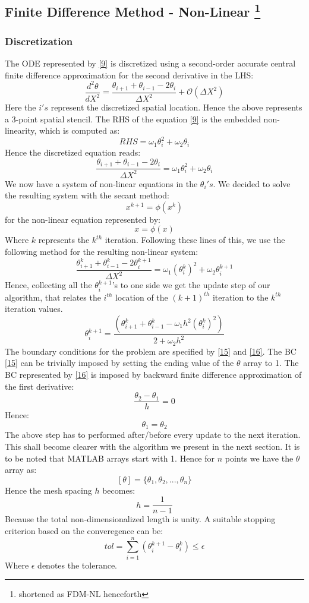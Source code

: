 \documentclass[12pt]{article}
\begin{document}
\subsection{Finite Difference Method - Non-Linear \footnote{shortened as FDM-NL henceforth}}
\subsubsection{Discretization}
The ODE represented by \eqref{9} is discretized using a second-order accurate central finite difference approximation for the second derivative in the LHS: 
\[
\frac{d^2\theta}{dX^2} = \frac{\theta_{i+1}+\theta_{i-1}-2\theta_i}{\Delta X^2} + \mathcal{O}(\Delta X^2) \tag{27} \label{27}
\]
Here the $i's$ represent the discretized spatial location.  Hence the above represents a 3-point spatial stencil. The RHS of the equation \eqref{9} is the embedded non-linearity, which is computed as:
\[
RHS = \omega_1 \theta_i^2 + \omega_2 \theta_i \tag{28} \label{28}
\]
Hence the discretized equation reads:
\[
 \frac{\theta_{i+1}+\theta_{i-1}-2\theta_i}{\Delta X^2} = \omega_1 \theta_i^2 + \omega_2 \theta_i \tag{29} \label{29}
\]
We now have a system of non-linear equations in the $\theta_i's$. We decided to solve the resulting system with the secant method: 
\[
x^{k+1} = \phi (x^k) \tag{30} \label{30}
\]
for the non-linear equation represented by:
\[
x = \phi (x) \tag{31} \label{31}
\]
Where $k$ represents the $k^{th}$ iteration. Following these lines of this, we use the following method for the resulting non-linear system: 
\[
\frac{\theta_{i+1}^k+\theta_{i-1}^k-2\theta_i^{k+1}}{\Delta X^2} = \omega_1 (\theta_i^k)^2 + \omega_2 \theta_i^{k+1} \tag{32} \label{32}
\]
Hence, collecting all the $\theta_i^{k+1}$'s to one side we get the update step of our algorithm, that relates the $i^{th}$ location of the $(k+1)^{th}$ iteration to the $k^{th}$ iteration values. 
\[
\theta_i^{k+1} = \frac{(\theta_{i+1}^k+\theta_{i-1}^k-\omega_1 h^2 (\theta_{i}^k)^2)}{2+\omega_2 h^2} \tag{33} \label{33}
\]
The boundary conditions for the problem are specified by \eqref{15} and \eqref{16}. The BC \eqref{15} can be trivially imposed by setting the ending value of the $\theta$ array to 1. The BC represented by \eqref{16} is imposed by backward finite difference approximation of the first derivative:
\[
\frac{\theta_2-\theta_1}{h} = 0 \label{34} \tag{34}
\]
Hence: 
\[
\theta_1 = \theta_2 \label{35} \tag{35}
\]
The above step has to performed after/before every update to the next iteration. This shall become clearer with the algorithm we present in the next section. It is to be noted that MATLAB arrays start with 1. Hence for $n$ points we have the $\theta$ array as: 
\[
[\theta] = \{\theta_1, \theta_2,...,\theta_n\} \tag{36} \label{36}
\]
Hence the mesh spacing $h$ becomes: 
\[
h = \frac{1}{n-1} \tag{37} \label{37}
\]
Because the total non-dimensionalized length is unity. A suitable stopping criterion based on the converegence can be:
\[
tol = \sum_{i=1}^n (\theta_i^{k+1} - \theta_i^k) \leq \epsilon \tag{38} \label{38}
\]
Where $\epsilon$ denotes the tolerance. 
\end{document}

